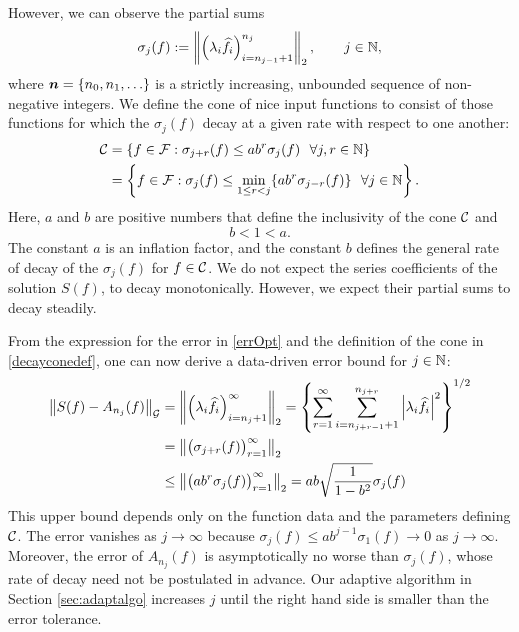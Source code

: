 \documentclass[graybox,footinfo]{svmult}
\newcommand{\DHJRnorm}[2][{}]{\ensuremath{\left \lVert #2 \right \rVert}_{#1}}
\newcommand{\DHJRabs}[1]{\ensuremath{{\left \lvert #1 \right \rvert}}}
\begin{document}
However, we can observe the partial sums 
\begin{equation} \label{sumdef}
\sigma_j(f) :
= \DHJRnorm[2]{ \left(\lambda_{i} \widehat{f}_{i} \right)_{i=n_{j-1}+1}^{n_j}}, \qquad j \in \bbN,
\end{equation}
where ${\boldsymbol{n}}  = \{n_0, n_1, \ldots\}$ is a strictly increasing, unbounded sequence of non-negative integers.  We define the cone of nice input functions to consist of those functions for which the $\sigma_j(f)$ decay at a given rate with respect to one another:
\begin{align} \label{decayconedef}
\calC &= \left\{ f \in \calF : \sigma_{j+r}(f) \le ab^r \sigma_j (f) \ \ \forall j,r \in \bbN \right\} \\
\nonumber
& = \left\{ f \in \calF : \sigma_j(f) \le \min_{1 \le r < j}\{ab^r\sigma_{j-r}(f)\} \ \ \forall j \in \bbN \right\}.
\end{align}
Here, $a$ and $b$ are positive numbers that define the inclusivity of the cone ${\mathcal{C}}$ and 
\begin{equation} \label{abcond}
b <1 < a.
\end{equation}
The constant $a$ is an inflation factor, and the constant $b$ defines the general rate of decay of the $\sigma_j(f)$ for $f \in {\mathcal{C}}$. We do not expect the series coefficients of the solution $S(f)$, to decay monotonically. However, we expect their partial sums to decay steadily.

From the expression for the error in \eqref{errOpt} and the definition of the cone in  \eqref{decayconedef}, one can now derive a data-driven error bound for $j \in {\mathbb{N}}$:
\begin{align}
\nonumber
\DHJRnorm[\calG]{S(f)-A_{n_j}(f)} &= \DHJRnorm[2]{\left(\lambda_{i} \widehat{f}_{i} \right)_{i = n_j+1}^\infty} = \left\{\sum_{r=1}^\infty \sum_{i=n_{j+r-1}+1}^{n_{j+r}}  \DHJRabs{\lambda_{i}\widehat{f}_{i} }^{2}  \right\}^{1/2}\\
\nonumber
&= \DHJRnorm[2]{ \bigl(\sigma_{j+r}(f)\bigr)_{r=1}^{\infty}} \\
&\le \DHJRnorm[2]{ \bigl(ab^r\sigma_{j}(f)\bigr)_{r=1}^{\infty}}
 = \displaystyle ab \sqrt{\frac{1}{1 - b^2}}\sigma_{j}(f)
 \label{algoineq}
\end{align}
This upper bound depends only on the function data and the parameters defining ${\mathcal{C}}$.  The error vanishes as $j \to \infty$ because $\sigma_j(f) \le ab^{j-1} \sigma_1(f) \to 0$ as $j \to \infty$.  Moreover, the error of $A_{n_j}(f)$ is asymptotically no worse than $\sigma_j(f)$, whose rate of decay need not be postulated in advance. Our adaptive algorithm in Section \ref{sec:adaptalgo} increases $j$ until the right hand side is smaller than the error tolerance.
\end{document}
